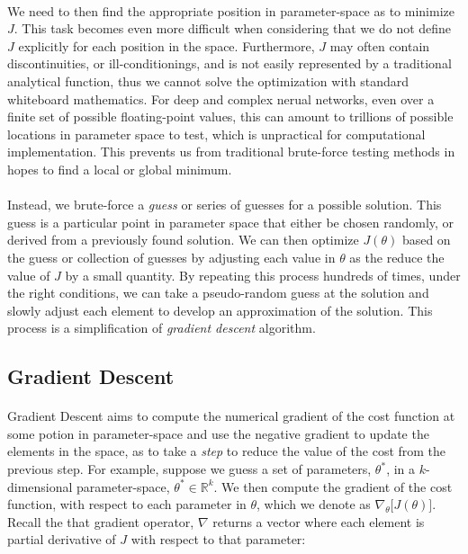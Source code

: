 \documentclass[12pt,letterpaper]{article}
\begin{document}
\paragraph*{}We need to then find the appropriate position in parameter-space as to minimize $J$. This task becomes even more difficult when considering that we do not define $J$ explicitly for each position in the space. Furthermore, $J$ may often contain discontinuities, or ill-conditionings, and is not easily represented by a traditional analytical function, thus we cannot solve the optimization with standard whiteboard mathematics. For deep and complex nerual networks, even over a finite set of possible floating-point values, this can amount to trillions of possible locations in parameter space to test, which is unpractical for computational implementation. This prevents us from traditional brute-force testing methods in hopes to find a local or global minimum. 

\paragraph*{}Instead, we brute-force a \textit{guess} or series of guesses for a possible solution. This guess is a particular point in parameter space that either be chosen randomly, or derived from a previously found solution. We can then optimize $J(\theta)$ based on the guess or collection of guesses by adjusting each value in $\theta$ as the reduce the value of $J$ by a small quantity. By repeating this process hundreds of times, under the right conditions, we can take a pseudo-random guess at the solution and slowly adjust each element to develop an approximation of the solution. This process is a simplification of \textit{gradient descent} algorithm.

\subsection{Gradient Descent}

\paragraph*{}Gradient Descent aims to compute the numerical gradient of the cost function at some potion in parameter-space and use the negative gradient to update the elements in the space, as to take a \textit{step} to reduce the value of the cost from the previous step. For example, suppose we guess a set of parameters, $\theta^*$, in a $k$-dimensional parameter-space, $\theta^* \in \mathbb{R}^k$. We then compute the gradient of the cost function, with respect to each parameter in $\theta$, which we denote as $\nabla_\theta \big[ J(\theta) \big]$. Recall the that gradient operator, $\nabla$ returns a vector where each element is partial derivative of $J$ with respect to that parameter:
\end{document}
